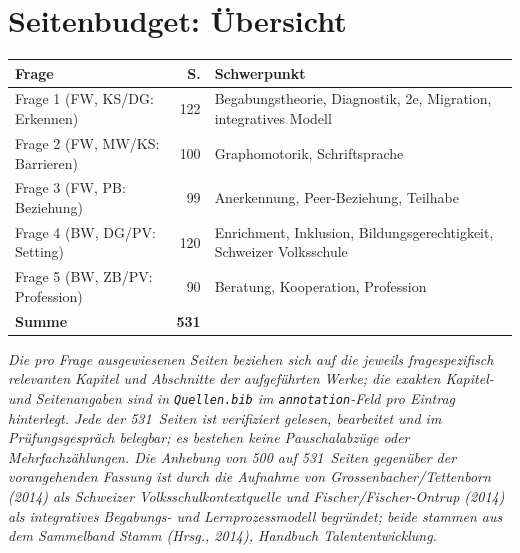 \documentclass[ngerman, a4paper]{article}
\begin{document}
\section*{Seitenbudget: Übersicht}
 
\begin{tabularx}{\textwidth}{Xr@{\hspace{1.5em}}X}
\toprule
\textbf{Frage} & \textbf{S.} & \textbf{Schwerpunkt} \\
\midrule
Frage 1 (FW, KS/DG: Erkennen)   & 122 & Begabungstheorie, Diagnostik, 2e, Migration, integratives Modell \\
Frage 2 (FW, MW/KS: Barrieren)  & 100 & Graphomotorik, Schriftsprache \\
Frage 3 (FW, PB: Beziehung)     &  99 & Anerkennung, Peer-Beziehung, Teilhabe \\
Frage 4 (BW, DG/PV: Setting)    & 120 & Enrichment, Inklusion, Bildungsgerechtigkeit, Schweizer Volksschule \\
Frage 5 (BW, ZB/PV: Profession) &  90 & Beratung, Kooperation, Profession \\
\midrule
\textbf{Summe}                  & \textbf{531} & \\
\bottomrule
\end{tabularx}

\vspace{0.8em}
\textit{Die pro Frage ausgewiesenen Seiten beziehen sich auf die jeweils
fragespezifisch relevanten Kapitel und Abschnitte der aufgeführten Werke;
die exakten Kapitel- und Seitenangaben sind in \texttt{Quellen.bib} im
\texttt{annotation}-Feld pro Eintrag hinterlegt. Jede der 531~Seiten ist
verifiziert gelesen, bearbeitet und im Prüfungsgespräch belegbar; es
bestehen keine Pauschalabzüge oder Mehrfachzählungen. Die Anhebung von 500
auf 531~Seiten gegenüber der vorangehenden Fassung ist durch die Aufnahme
von Grossenbacher/Tettenborn (2014) als Schweizer Volksschulkontextquelle
und Fischer/Fischer-Ontrup (2014) als integratives Begabungs- und
Lernprozessmodell begründet; beide stammen aus dem Sammelband
Stamm (Hrsg., 2014), \textit{Handbuch Talententwicklung}.}
 
\newpage
 
\printbibliography[title={Literaturverzeichnis}]
 
\end{document}
